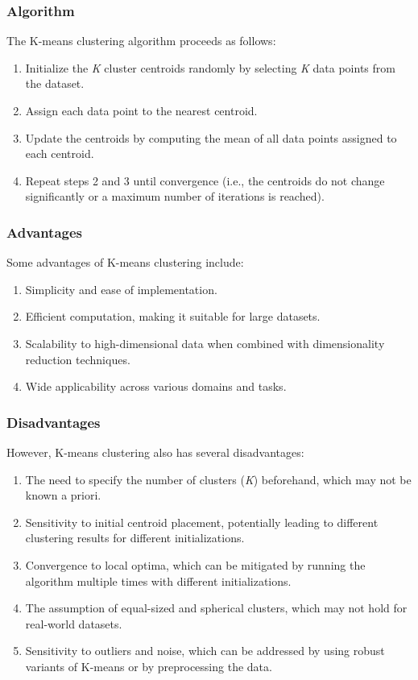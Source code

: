 \documentclass[12pt]{article}
\begin{document}
\subsubsection{Algorithm}
The K-means clustering algorithm proceeds as follows:
\begin{enumerate}
\item Initialize the \textit{K} cluster centroids randomly by selecting \textit{K} data points from the dataset.
\item Assign each data point to the nearest centroid.
\item Update the centroids by computing the mean of all data points assigned to each centroid.
\item Repeat steps 2 and 3 until convergence (i.e., the centroids do not change significantly or a maximum number of iterations is reached).
\end{enumerate}

\subsubsection{Advantages}
Some advantages of K-means clustering include:
\begin{enumerate}
\item Simplicity and ease of implementation.
\item Efficient computation, making it suitable for large datasets.
\item Scalability to high-dimensional data when combined with dimensionality reduction techniques.
\item Wide applicability across various domains and tasks.
\end{enumerate}

\subsubsection{Disadvantages}
However, K-means clustering also has several disadvantages:
\begin{enumerate}
\item The need to specify the number of clusters (\textit{K}) beforehand, which may not be known a priori.
\item Sensitivity to initial centroid placement, potentially leading to different clustering results for different initializations.
\item Convergence to local optima, which can be mitigated by running the algorithm multiple times with different initializations.
\item The assumption of equal-sized and spherical clusters, which may not hold for real-world datasets.
\item Sensitivity to outliers and noise, which can be addressed by using robust variants of K-means or by preprocessing the data.
\end{enumerate}
\end{document}
